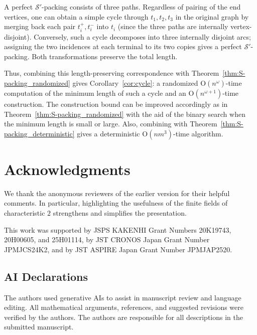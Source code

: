 \documentclass[11pt, a4paper]{article}
\theoremstyle{plain}
\theoremstyle{definition}
\theoremstyle{remark}
\newcommand{\cS}{\mathcal{S}}
\begin{document}
A perfect $\cS'$-packing consists of three paths.
Regardless of pairing of the end vertices, one can obtain a simple cycle through $t_1,t_2,t_3$ in the original graph by merging back each pair $t_i^+,t_i^-$ into $t_i$ (since the three paths are internally vertex-disjoint).
Conversely, such a cycle decomposes into three internally disjoint arcs; assigning the two incidences at each terminal to its two copies gives a perfect $\cS'$-packing.
Both transformations preserve the total length.

Thus, combining this length-preserving correspondence with Theorem~\ref{thm:S-packing_randomized} gives Corollary~\ref{cor:cycle}: a randomized $\mathrm{O}(n^\omega)$-time computation of the minimum length of such a cycle and an $\mathrm{O}(n^{\omega + 1})$-time construction.
The construction bound can be improved accordingly as in Theorem~\ref{thm:S-packing_randomized} with the aid of the binary search when the minimum length is small or large.
Also, combining with Theorem~\ref{thm:S-packing_deterministic} gives a deterministic $\mathrm{O}(nm^3)$-time algorithm.



\section*{Acknowledgments}
We thank the anonymous reviewers of the earlier version for their helpful comments.
In particular, highlighting the usefulness of the finite fields of characteristic $2$ strengthens and simplifies the presentation.

This work was supported by JSPS KAKENHI Grant Numbers 20K19743, 20H00605, and 25H01114, by JST CRONOS Japan Grant Number JPMJCS24K2, and by JST ASPIRE Japan Grant Number JPMJAP2520.

\subsection*{AI Declarations}
The authors used generative AIs to assist in manuscript review and language editing.
All mathematical arguments, references, and suggested revisions were verified by the authors.
The authors are responsible for all descriptions in the submitted manuscript.
\end{document}
